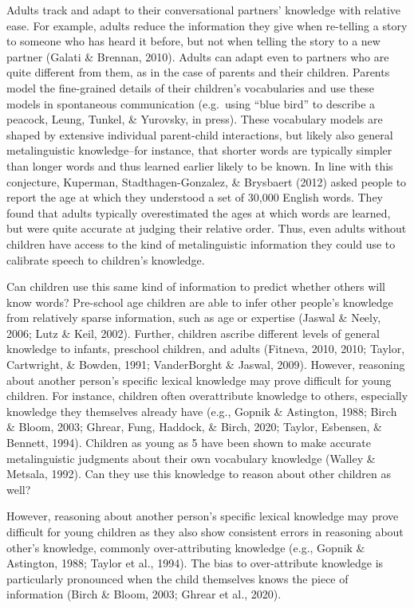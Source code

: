 \documentclass[10pt, letterpaper]{article}
\begin{document}
Adults track and adapt to their conversational partners' knowledge with
relative ease. For example, adults reduce the information they give when
re-telling a story to someone who has heard it before, but not when
telling the story to a new partner (Galati \& Brennan, 2010). Adults can
adapt even to partners who are quite different from them, as in the case
of parents and their children. Parents model the fine-grained details of
their children's vocabularies and use these models in spontaneous
communication (e.g.~using ``blue bird'' to describe a peacock, Leung,
Tunkel, \& Yurovsky, in press). These vocabulary models are shaped by
extensive individual parent-child interactions, but likely also general
metalinguistic knowledge--for instance, that shorter words are typically
simpler than longer words and thus learned earlier likely to be known.
In line with this conjecture, Kuperman, Stadthagen-Gonzalez, \&
Brysbaert (2012) asked people to report the age at which they understood
a set of 30,000 English words. They found that adults typically
overestimated the ages at which words are learned, but were quite
accurate at judging their relative order. Thus, even adults without
children have access to the kind of metalinguistic information they
could use to calibrate speech to children's knowledge.

Can children use this same kind of information to predict whether others
will know words? Pre-school age children are able to infer other
people's knowledge from relatively sparse information, such as age or
expertise (Jaswal \& Neely, 2006; Lutz \& Keil, 2002). Further, children
ascribe different levels of general knowledge to infants, preschool
children, and adults (Fitneva, 2010, 2010; Taylor, Cartwright, \&
Bowden, 1991; VanderBorght \& Jaswal, 2009). However, reasoning about
another person's specific lexical knowledge may prove difficult for
young children. For instance, children often overattribute knowledge to
others, especially knowledge they themselves already have (e.g., Gopnik
\& Astington, 1988; Birch \& Bloom, 2003; Ghrear, Fung, Haddock, \&
Birch, 2020; Taylor, Esbensen, \& Bennett, 1994). Children as young as 5
have been shown to make accurate metalinguistic judgments about their
own vocabulary knowledge (Walley \& Metsala, 1992). Can they use this
knowledge to reason about other children as well?

However, reasoning about another person's specific lexical knowledge may
prove difficult for young children as they also show consistent errors
in reasoning about other's knowledge, commonly over-attributing
knowledge (e.g., Gopnik \& Astington, 1988; Taylor et al., 1994). The
bias to over-attribute knowledge is particularly pronounced when the
child themselves knows the piece of information (Birch \& Bloom, 2003;
Ghrear et al., 2020).
\end{document}
